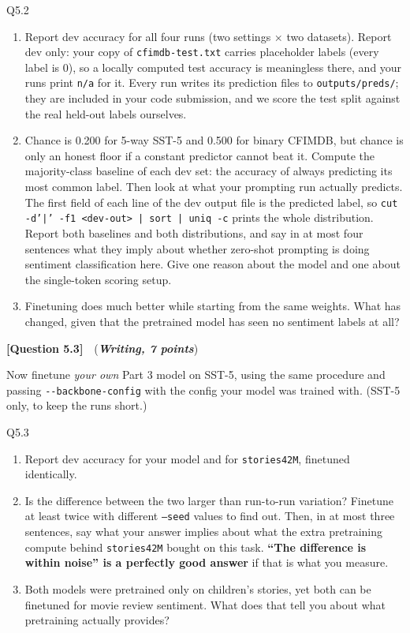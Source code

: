 \documentclass[11pt]{article}
\newcommand{\question}[3]{%
  \vspace{0.9em}
  \noindent\textbf{[Question #1]}\ \ (\textit{\textbf{#2, #3 points}})\quad
}
\begin{document}
\begin{deliverables}{Q5.2}
\begin{enumerate}[label=\Alph*., leftmargin=1.6em]
  \item Report dev accuracy for all four runs (two settings $\times$ two datasets). Report dev
    only: your copy of \texttt{cfimdb-test.txt} carries placeholder labels (every label is 0),
    so a locally computed test accuracy is meaningless there, and your runs print \texttt{n/a}
    for it. Every run writes its prediction files to \texttt{outputs/preds/}; they are included
    in your code submission, and we score the test split against the real held-out labels
    ourselves.
  \item Chance is 0.200 for 5-way SST-5 and 0.500 for binary CFIMDB, but chance is only an
    honest floor if a constant predictor cannot beat it. Compute the majority-class baseline of
    each dev set: the accuracy of always predicting its most common label. Then look at what
    your prompting run actually predicts. The first field of each line of the dev output file
    is the predicted label, so \texttt{cut -d'|' -f1 <dev-out> | sort | uniq -c} prints the
    whole distribution. Report both baselines and both distributions, and say in at most four
    sentences what they imply about whether zero-shot prompting is doing sentiment
    classification here. Give one reason about the model and one about the single-token
    scoring setup.
  \item Finetuning does much better while starting from the same weights. What has changed, given
    that the pretrained model has seen no sentiment labels at all?
\end{enumerate}
\end{deliverables}

\question{5.3}{Writing}{7}
Now finetune \emph{your own} Part 3 model on SST-5, using the same procedure and passing
\texttt{-\/-backbone-config} with the config your model was trained with. (SST-5 only, to keep
the runs short.)

\begin{deliverables}{Q5.3}
\begin{enumerate}[label=\Alph*., leftmargin=1.6em]
  \item Report dev accuracy for your model and for \texttt{stories42M}, finetuned identically.
  \item Is the difference between the two larger than run-to-run variation? Finetune at least twice
    with different \texttt{--seed} values to find out. Then, in at most three sentences, say what
    your answer implies about what the extra pretraining compute behind \texttt{stories42M} bought
    on this task. \textbf{``The difference is within noise'' is a perfectly good answer} if that is
    what you measure.
  \item Both models were pretrained only on children's stories, yet both can be finetuned for movie
    review sentiment. What does that tell you about what pretraining actually provides?
\end{enumerate}
\end{deliverables}
\end{document}

